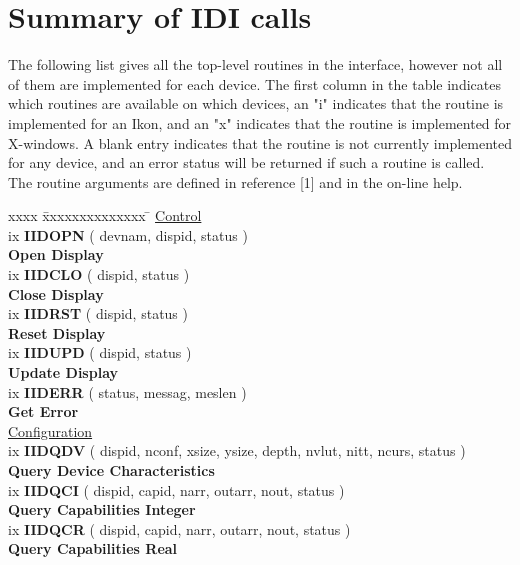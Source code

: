 \section{Summary of IDI calls}

The following list gives all the top-level routines in the interface,
however not all of them are implemented for each device.
The first column in the table indicates which routines are available on
which devices, an "i" indicates that the routine is implemented for an
Ikon, and an "x" indicates that the routine is implemented for X-windows.
A blank entry indicates that the routine is not currently implemented
for any device, and an error status will be returned if such a routine
is called. The routine arguments are defined in reference [1] and in the
on-line help.

\begin{tabbing}
xxxx \= xxxxxxxxxxxxxx \= \kill
\> \underline{Control}\\ [1.5ex]
ix \> {\bf IIDOPN} \> ( devnam, dispid, status )\\
                \> \> {\bf Open Display}\\ [1.5ex]
ix \> {\bf IIDCLO} \> ( dispid, status )\\
                \> \> {\bf Close Display}\\ [1.5ex]
ix \> {\bf IIDRST} \> ( dispid, status )\\
                \> \> {\bf Reset Display}\\ [1.5ex]
ix \> {\bf IIDUPD} \> ( dispid, status )\\
                \> \> {\bf Update Display}\\ [1.5ex]
ix \> {\bf IIDERR} \> ( status, messag, meslen )\\
                \> \> {\bf Get Error}\\ [1.5ex]
\> \underline{Configuration}\\ [1.5ex]
ix \> {\bf IIDQDV} \> ( dispid, nconf, xsize, ysize, depth, nvlut, nitt, ncurs,
                        status )\\
                \> \> {\bf Query Device Characteristics}\\ [1.5ex]
ix \> {\bf IIDQCI} \> ( dispid, capid, narr, outarr, nout, status )\\
                \> \> {\bf Query Capabilities Integer}\\ [1.5ex]
ix \> {\bf IIDQCR} \> ( dispid, capid, narr, outarr, nout, status )\\
                \> \> {\bf Query Capabilities Real}\\ [1.5ex]

\end{tabbing}

